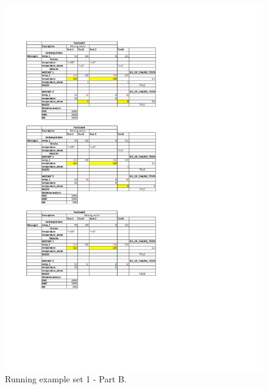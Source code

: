 \begin{figure}[tb]
\centering
\includegraphics[width=18cm]{damat/DataDrivenExample1B}
\caption{Running example set 1 - Part B.}
\label{fig:damat:RunningExample1B}
\end{figure}

